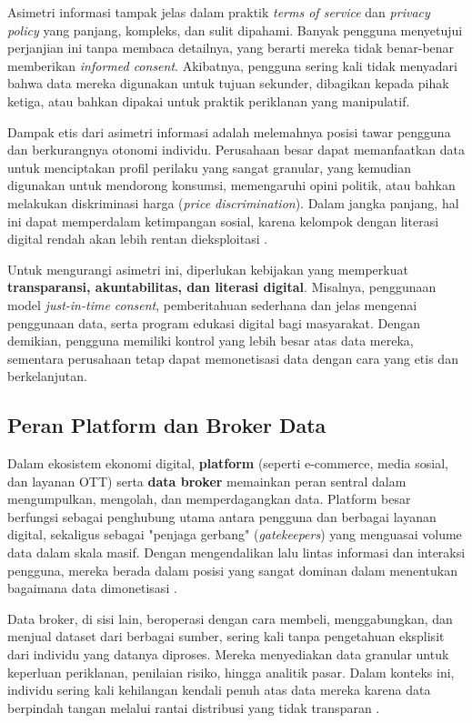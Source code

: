 Asimetri informasi tampak jelas dalam praktik \textit{terms of service} dan \textit{privacy policy} yang panjang, kompleks, dan sulit dipahami. Banyak pengguna menyetujui perjanjian ini tanpa membaca detailnya, yang berarti mereka tidak benar-benar memberikan \textit{informed consent}. Akibatnya, pengguna sering kali tidak menyadari bahwa data mereka digunakan untuk tujuan sekunder, dibagikan kepada pihak ketiga, atau bahkan dipakai untuk praktik periklanan yang manipulatif.  

Dampak etis dari asimetri informasi adalah melemahnya posisi tawar pengguna dan berkurangnya otonomi individu. Perusahaan besar dapat memanfaatkan data untuk menciptakan profil perilaku yang sangat granular, yang kemudian digunakan untuk mendorong konsumsi, memengaruhi opini politik, atau bahkan melakukan diskriminasi harga (\textit{price discrimination}). Dalam jangka panjang, hal ini dapat memperdalam ketimpangan sosial, karena kelompok dengan literasi digital rendah akan lebih rentan dieksploitasi \cite{zwitter2014}.  

Untuk mengurangi asimetri ini, diperlukan kebijakan yang memperkuat \textbf{transparansi, akuntabilitas, dan literasi digital}. Misalnya, penggunaan model \textit{just-in-time consent}, pemberitahuan sederhana dan jelas mengenai penggunaan data, serta program edukasi digital bagi masyarakat. Dengan demikian, pengguna memiliki kontrol yang lebih besar atas data mereka, sementara perusahaan tetap dapat memonetisasi data dengan cara yang etis dan berkelanjutan.

\subsection{Peran Platform dan Broker Data}

Dalam ekosistem ekonomi digital, \textbf{platform} (seperti e-commerce, media sosial, dan layanan OTT) serta \textbf{data broker} memainkan peran sentral dalam mengumpulkan, mengolah, dan memperdagangkan data. Platform besar berfungsi sebagai penghubung utama antara pengguna dan berbagai layanan digital, sekaligus sebagai "penjaga gerbang" (\textit{gatekeepers}) yang menguasai volume data dalam skala masif. Dengan mengendalikan lalu lintas informasi dan interaksi pengguna, mereka berada dalam posisi yang sangat dominan dalam menentukan bagaimana data dimonetisasi \cite{eisenmann2011platform}.  

Data broker, di sisi lain, beroperasi dengan cara membeli, menggabungkan, dan menjual dataset dari berbagai sumber, sering kali tanpa pengetahuan eksplisit dari individu yang datanya diproses. Mereka menyediakan data granular untuk keperluan periklanan, penilaian risiko, hingga analitik pasar. Dalam konteks ini, individu sering kali kehilangan kendali penuh atas data mereka karena data berpindah tangan melalui rantai distribusi yang tidak transparan \cite{crain2018data}.  

